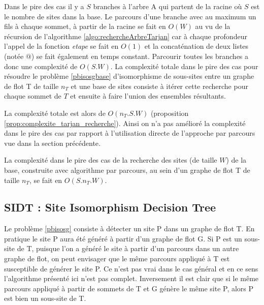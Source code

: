 Dans le pire des cas il y a $S$ branches à l'arbre A qui partent de la racine où $S$ est le nombre de sites dans la base. Le parcours d'une branche avec au maximum un fils à chaque sommet, à partir de la racine se fait en $O(W)$ au vu de la récursion de l'algorithme \ref{algo:rechercheArbreTarjan} car à chaque profondeur l'appel de la fonction \textit{etape} se fait en $O(1)$ et la concaténation de deux listes (notée $@$) se fait également en temps constant.
Parcourir toutes les branches a donc une complexité de $O(S.W)$. 
La complexité totale dans le pire des cas pour résoudre le problème \ref{pbisosgbase} d'isomorphisme de sous-sites entre un graphe de flot T de taille $n_T$ et une base de sites consiste à itérer cette recherche pour chaque sommet de $T$ et ensuite à faire l'union des ensembles résultants. %


La complexité totale est alors de $O(n_T.S.W)$ (proposition \ref{prop:complexite_tarjan_recherche}). Ainsi on n'a pas amélioré la complexité dans le pire des cas par rapport à l'utilisation directe de l'approche par parcours vue dans la section précédente.

\begin{prop}
 La complexité dans le pire des cas de la recherche des sites (de taille $W$) de la base, construite avec algorithme par parcours, au sein d'un graphe de flot T de taille $n_T$, se fait en $O(S.n_T.W)$.
\label{prop:complexite_tarjan_recherche}
\end{prop}


\FloatBarrier
\subsection{SIDT : Site Isomorphism Decision Tree}
Le problème \ref{pbisosg} consiste à détecter un site P dans un graphe de flot T. En pratique le site P aura été généré à partir d'un graphe de flot G. Si P est un sous-site de T, puisque l'on a généré le site à partir d'un parcours dans un autre graphe de flot, on peut envisager que le même parcours appliqué à T est susceptible de générer le site P. Ce n'est pas vrai dans le cas général et en ce sens l'algorithme présenté ici n'est pas complet.
Inversement il est clair que si le même parcours appliqué à partir de sommets de T et G génère le même site P, alors P est bien un sous-site de T.

